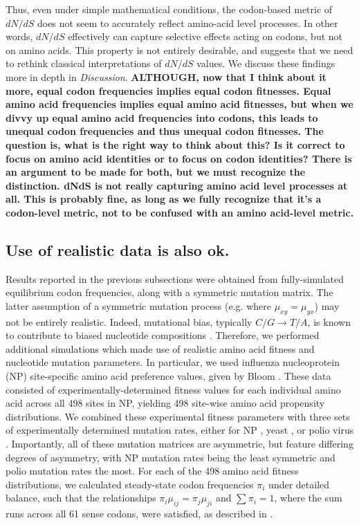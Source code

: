 \documentclass[11pt]{article}
\begin{document}
Thus, even under simple mathematical conditions, the codon-based metric of $dN/dS$ does not seem to accurately reflect amino-acid level processes. In other words, $dN/dS$ effectively can capture selective effects acting on codons, but not on amino acids. This property is not entirely desirable, and suggests that we need to rethink classical interpretations of $dN/dS$ values. We discuss these findings more in depth in \textit{Discussion}.
\textbf{ALTHOUGH, now that I think about it more, equal codon frequencies implies equal codon fitnesses. Equal amino acid frequencies implies equal amino acid fitnesses, but when we divvy up equal amino acid frequencies into codons, this leads to unequal codon frequencies and thus unequal codon fitnesses. The question is, what is the right way to think about this? Is it correct to focus on amino acid identities or to focus on codon identities? There is an argument to be made for both, but we must recognize the distinction. dNdS is not really capturing amino acid level processes at all. This is probably fine, as long as we fully recognize that it's a codon-level metric, not to be confused with an amino acid-level metric.}


\subsection*{Use of realistic data is also ok.}

Results reported in the previous subsections were obtained from fully-simulated equilibrium codon frequencies, along with a symmetric mutation matrix. The latter assumption of a symmetric mutation process (e.g. where $\mu_{xy} = \mu_{yx}$) may not be entirely realistic. Indeed, mutational bias, typically $C/G \rightarrow T/A$, is known to contribute to biased nucleotide compositions \cite{Hernandez2007,HershbergPetrov2010,Zhu2014,Acevedo2014}. Therefore, we performed additional simulations which made use of realistic amino acid fitness and nucleotide mutation parameters.
 In particular, we used influenza nucleoprotein (NP) site-specific amino acid preference values, given by Bloom \cite{Bloom2014a}. These data consisted of experimentally-determined fitness values for each individual amino acid across all 498 sites in NP, yielding 498 site-wise amino acid propensity distributions. We combined these experimental fitness parameters with three sets of experimentally determined mutation rates, either for NP \cite{Bloom2014a}, yeast \cite{Zhu2014}, or polio virus \cite{Acevedo2014}. Importantly, all of these mutation matrices are asymmetric, but feature differing degrees of asymmetry, with NP mutation rates being the least symmetric and polio mutation rates the most. For each of the 498 amino acid fitness distributions, we calculated steady-state codon frequencies $\pi_i$ under detailed balance, such that the relationships $\pi_i\mu_{ij} = \pi_j\mu_{ji}$ and $\sum\pi_i = 1$, where the sum runs across all 61 sense codons, were satisfied, as described in \cite{Bloom2014a,Bloom2014b}.
\end{document}
